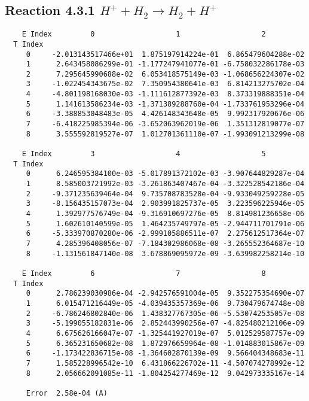\documentclass[12pt]{article}
\begin{document}
                               


\newpage
\subsection{
Reaction 4.3.1 $   H^+ + H_2 \rightarrow H_2 + H^+$}


\begin{small}\begin{verbatim}
    E Index         0                   1                   2
  T Index
     0     -2.013143517466e+01  1.875197914224e-01  6.865479604288e-02
     1      2.643458086299e-01 -1.177247941077e-01 -6.758032286178e-03
     2      7.295645990688e-02  6.053418575149e-03 -1.068656224307e-02
     3     -1.022454343675e-02  7.350954380641e-03  6.814213275702e-04
     4     -4.801198168030e-03 -1.111612877392e-03  8.373319888351e-04
     5      1.141613586234e-03 -1.371389288760e-04 -1.733761953296e-04
     6     -3.388853048483e-05  4.426148343648e-05  9.992317920676e-06
     7     -6.418225985394e-06 -3.652063962019e-06  1.351312819077e-07
     8      3.555592819527e-07  1.012701361110e-07 -1.993091213299e-08

    E Index         3                   4                   5
  T Index
     0      6.246595384100e-03 -5.017891372102e-03 -3.907644829287e-04
     1      8.585003721992e-03 -3.261863407467e-04 -3.322528542186e-04
     2     -9.371235639464e-04  9.735708783528e-04 -9.933049259228e-05
     3     -8.156435157073e-04  2.903991825737e-05  3.223596225946e-05
     4      1.392977576749e-04 -9.316910697276e-05  8.814981236658e-06
     5      1.602610140599e-05  1.464235749797e-05 -2.944711701791e-06
     6     -5.333970870280e-06 -2.999105886511e-07  2.275612517364e-07
     7      4.285396408056e-07 -7.184302986068e-08 -3.265552364687e-10
     8     -1.131561847140e-08  3.678869095972e-09 -3.639982258214e-10

    E Index         6                   7                   8
  T Index
     0      2.786239030986e-04 -2.942576591004e-05  9.352275354690e-07
     1      6.015471216449e-05 -4.039435357369e-06  9.730479674748e-08
     2     -6.786246802840e-06  1.438327767305e-06 -5.530742535057e-08
     3     -5.199055182831e-06  2.852443990256e-07 -4.825480212106e-09
     4      6.675626166047e-07 -1.325441927019e-07  5.012529587757e-09
     5      6.365231650682e-08  1.872976659964e-08 -1.014883015867e-09
     6     -1.173422836715e-08 -1.364602870139e-09  9.566404348683e-11
     7      1.585228996542e-10  6.431866226702e-11 -4.507074278992e-12
     8      2.056662091085e-11 -1.804254277469e-12  9.042973335167e-14

     Error  2.58e-04 (A)
\end{verbatim}\end{small}
\end{document}
